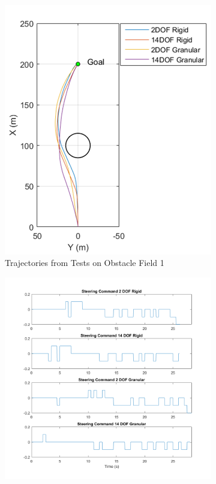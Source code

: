 \documentclass[12pt,twocolumn]{article}
\begin{document}
\begin{figure}
	\centering
	\begin{subfigure}[b]{\columnwidth}
		\centering
		\includegraphics[width=\columnwidth]{Figs/ObstacleField1Trajectories.png}
		\caption{{\small Trajectories from Tests on Obstacle Field 1}}   
		\label{fig:ObstacleField1Trajectories}
	\end{subfigure}
	\hfill
	\begin{subfigure}[b]{\columnwidth}
		\centering
		\includegraphics[width=\columnwidth]{Figs/SteeringCommandsField1.png}

\end{subfigure}
\end{figure}
\end{document}
